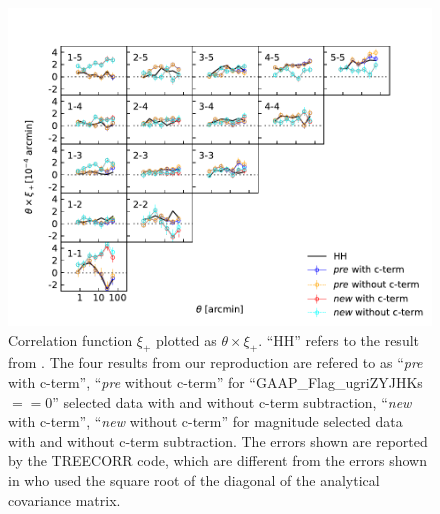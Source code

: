 \documentclass[fleqn,usenatbib]{mnras}
\begin{document}
\begin{figure}
    \centering
    \includegraphics{compare_xip.pdf}
    \caption{Correlation function $\xi_+$ plotted as $\theta\times\xi_+$. ``HH'' refers to the result from \citet{2018arXiv181206076H}. The four results from our reproduction are refered to as ``{\it pre} with c-term'', ``{\it pre} without c-term'' for ``GAAP\_Flag\_ugriZYJHKs $==0$'' selected data with and without c-term subtraction, ``{\it new} with c-term'', ``{\it new} without c-term'' for magnitude selected data with and without c-term subtraction. The errors shown are reported by the TREECORR code, which are different from the errors shown in \citet{2018arXiv181206076H} who used the square root of the diagonal of the analytical covariance matrix. }
    \label{fig:xip}
\end{figure}
\end{document}

